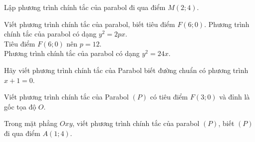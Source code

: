 \begin{bt}%
	Lập phương trình chính tắc của parabol đi qua điểm $M(2;4)$.	
\end{bt}

\begin{bt}%
	Viết phương trình chính tắc của parabol, biết tiêu điểm $F(6;0)$.
	\loigiai
	{
		Phương trình chính tắc của parabol có dạng $y^2=2px$.\\
		Tiêu điểm $F(6;0)$ nên $p=12$.\\
		Phương trình chính tắc của parabol có dạng $y^2=24x$.
	}
\end{bt}

\begin{bt}%
	Hãy viết phương trình chính tắc của Parabol biết đường chuẩn có phương trình $ x + 1 = 0 $.
\end{bt}

\begin{bt}%
	Viết phương trình chính tắc của Parabol $ (P) $ có tiêu điểm $ F(3 ; 0) $ và đỉnh là gốc tọa độ $ O $.
\end{bt}

\begin{bt}%
	Trong mặt phẳng $Oxy$, viết phương trình chính tắc của parabol $(P)$, biết $(P)$ đi qua điểm $A(1;4)$.
\end{bt}

